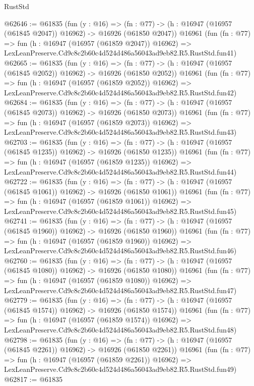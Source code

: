 \begin{lexlean}{RustStd}
\begin{coremodule}
@62646 := @61835
    (fun (y : @16) =>
    (fn : @77) -> (h : @16947 (@16957 (@61845 @2047)) @16962) -> @16926 (@61850 @2047))
    @16961
    (fun (fn : @77) =>
    fun (h : @16947 (@16957 (@61859 @2047)) @16962) =>
    LexLeanPreserve.Cd9c8c2b60c4d524d486a56043ad9eb82.R5.RustStd.fun41)
@62665 := @61835
    (fun (y : @16) =>
    (fn : @77) -> (h : @16947 (@16957 (@61845 @2052)) @16962) -> @16926 (@61850 @2052))
    @16961
    (fun (fn : @77) =>
    fun (h : @16947 (@16957 (@61859 @2052)) @16962) =>
    LexLeanPreserve.Cd9c8c2b60c4d524d486a56043ad9eb82.R5.RustStd.fun42)
@62684 := @61835
    (fun (y : @16) =>
    (fn : @77) -> (h : @16947 (@16957 (@61845 @2073)) @16962) -> @16926 (@61850 @2073))
    @16961
    (fun (fn : @77) =>
    fun (h : @16947 (@16957 (@61859 @2073)) @16962) =>
    LexLeanPreserve.Cd9c8c2b60c4d524d486a56043ad9eb82.R5.RustStd.fun43)
@62703 := @61835
    (fun (y : @16) =>
    (fn : @77) -> (h : @16947 (@16957 (@61845 @1235)) @16962) -> @16926 (@61850 @1235))
    @16961
    (fun (fn : @77) =>
    fun (h : @16947 (@16957 (@61859 @1235)) @16962) =>
    LexLeanPreserve.Cd9c8c2b60c4d524d486a56043ad9eb82.R5.RustStd.fun44)
@62722 := @61835
    (fun (y : @16) =>
    (fn : @77) -> (h : @16947 (@16957 (@61845 @1061)) @16962) -> @16926 (@61850 @1061))
    @16961
    (fun (fn : @77) =>
    fun (h : @16947 (@16957 (@61859 @1061)) @16962) =>
    LexLeanPreserve.Cd9c8c2b60c4d524d486a56043ad9eb82.R5.RustStd.fun45)
@62741 := @61835
    (fun (y : @16) =>
    (fn : @77) -> (h : @16947 (@16957 (@61845 @1960)) @16962) -> @16926 (@61850 @1960))
    @16961
    (fun (fn : @77) =>
    fun (h : @16947 (@16957 (@61859 @1960)) @16962) =>
    LexLeanPreserve.Cd9c8c2b60c4d524d486a56043ad9eb82.R5.RustStd.fun46)
@62760 := @61835
    (fun (y : @16) =>
    (fn : @77) -> (h : @16947 (@16957 (@61845 @1080)) @16962) -> @16926 (@61850 @1080))
    @16961
    (fun (fn : @77) =>
    fun (h : @16947 (@16957 (@61859 @1080)) @16962) =>
    LexLeanPreserve.Cd9c8c2b60c4d524d486a56043ad9eb82.R5.RustStd.fun47)
@62779 := @61835
    (fun (y : @16) =>
    (fn : @77) -> (h : @16947 (@16957 (@61845 @1574)) @16962) -> @16926 (@61850 @1574))
    @16961
    (fun (fn : @77) =>
    fun (h : @16947 (@16957 (@61859 @1574)) @16962) =>
    LexLeanPreserve.Cd9c8c2b60c4d524d486a56043ad9eb82.R5.RustStd.fun48)
@62798 := @61835
    (fun (y : @16) =>
    (fn : @77) -> (h : @16947 (@16957 (@61845 @2261)) @16962) -> @16926 (@61850 @2261))
    @16961
    (fun (fn : @77) =>
    fun (h : @16947 (@16957 (@61859 @2261)) @16962) =>
    LexLeanPreserve.Cd9c8c2b60c4d524d486a56043ad9eb82.R5.RustStd.fun49)
@62817 := @61835

\end{coremodule}
\end{lexlean}

